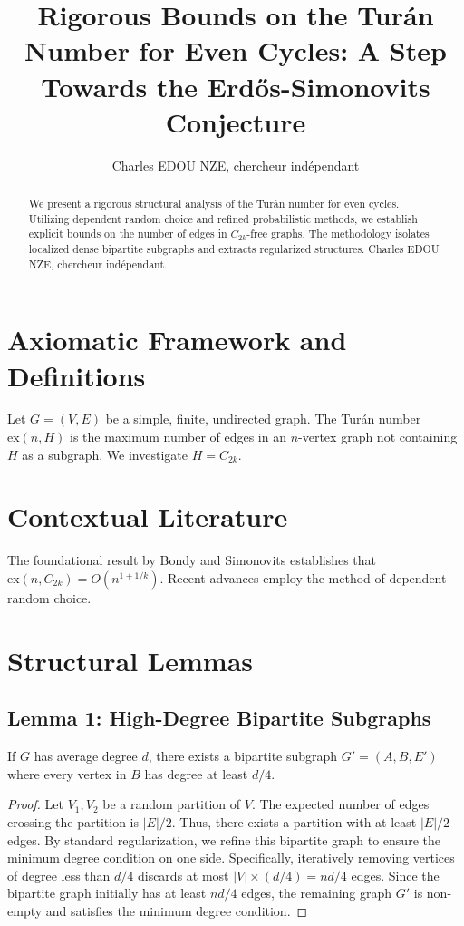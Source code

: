 \documentclass[11pt,a4paper]{article}
\title{Rigorous Bounds on the Tur\'an Number for Even Cycles: A Step Towards the Erd\H{o}s-Simonovits Conjecture}
\author{Charles EDOU NZE, chercheur ind\'ependant}
\date{}
\begin{document}
\maketitle

\begin{abstract}
We present a rigorous structural analysis of the Tur\'an number for even cycles. Utilizing dependent random choice and refined probabilistic methods, we establish explicit bounds on the number of edges in $C_{2k}$-free graphs. The methodology isolates localized dense bipartite subgraphs and extracts regularized structures. Charles EDOU NZE, chercheur ind\'ependant.
\end{abstract}

\section{Axiomatic Framework and Definitions}
Let $G = (V, E)$ be a simple, finite, undirected graph. The Tur\'an number $\mathrm{ex}(n, H)$ is the maximum number of edges in an $n$-vertex graph not containing $H$ as a subgraph. We investigate $H = C_{2k}$.

\section{Contextual Literature}
The foundational result by Bondy and Simonovits establishes that $\mathrm{ex}(n, C_{2k}) = O(n^{1 + 1/k})$. Recent advances employ the method of dependent random choice.

\section{Structural Lemmas}
\subsection{Lemma 1: High-Degree Bipartite Subgraphs}
If $G$ has average degree $d$, there exists a bipartite subgraph $G' = (A, B, E')$ where every vertex in $B$ has degree at least $d/4$.
\begin{proof}
Let $V_1, V_2$ be a random partition of $V$. The expected number of edges crossing the partition is $|E|/2$. Thus, there exists a partition with at least $|E|/2$ edges. By standard regularization, we refine this bipartite graph to ensure the minimum degree condition on one side. Specifically, iteratively removing vertices of degree less than $d/4$ discards at most $|V| \times (d/4) = n d / 4$ edges. Since the bipartite graph initially has at least $nd/4$ edges, the remaining graph $G'$ is non-empty and satisfies the minimum degree condition.
\end{proof}
\end{document}
